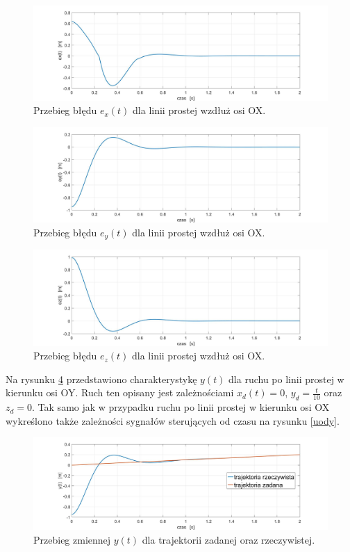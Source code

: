 \documentclass[eng,printmode]{mgr}
\begin{document}
\begin{figure}[!h]
\centering
\includegraphics[width=1\textwidth]{exodx.jpg}
\caption{\label{exodx}Przebieg błędu $e_x(t)$ dla linii prostej wzdłuż osi OX.}
\end{figure}
\begin{figure}[!h]
\centering
\includegraphics[width=1\textwidth]{eyodx.jpg}
\caption{\label{eyodx}Przebieg błędu $e_y(t)$ dla linii prostej wzdłuż osi OX.}
\end{figure}
\begin{figure}[!h]
\centering
\includegraphics[width=1\textwidth]{ezodx.jpg}
\caption{\label{ezodx}Przebieg błędu $e_z(t)$ dla linii prostej wzdłuż osi OX.}
\end{figure}
\newpage
Na rysunku \ref{ody} przedstawiono charakterystykę $y(t)$ dla ruchu po linii prostej w kierunku osi OY. Ruch ten opisany jest zależnościami $x_d(t)=0$, $y_d=\frac{t}{10}$ oraz $z_d=0$. Tak samo jak w przypadku ruchu po linii prostej w kierunku osi OX wykreślono także zależności sygnałów sterujących od czasu na rysunku \ref{uody}.
\hfill \break
\begin{figure}[!h]
\centering
\includegraphics[width=1\textwidth]{ody.jpg}
\caption{\label{ody}Przebieg zmiennej $y(t)$ dla trajektorii zadanej oraz rzeczywistej.}
\end{figure}
\end{document}
